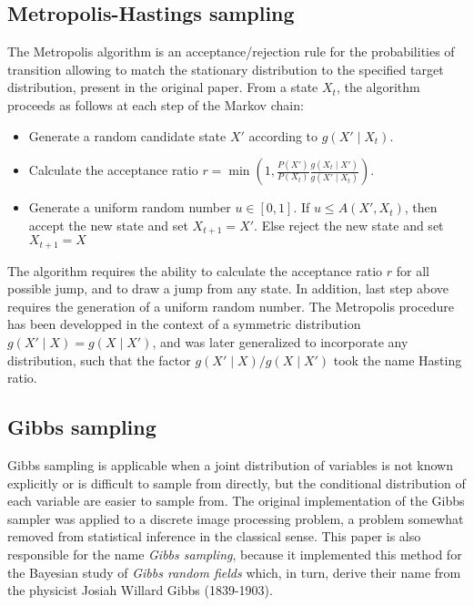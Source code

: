 \subsection{Metropolis-Hastings sampling}

The Metropolis algorithm is an acceptance/rejection rule for the probabilities of transition allowing to match the stationary distribution to the specified target distribution, present in the original paper.
From a state $X_t$, the algorithm proceeds as follows at each step of the Markov chain:
\begin{itemize}
	\item Generate a random candidate state $X'$ according to $g(X'\mid X_t)$.
	\item Calculate the acceptance ratio $\displaystyle r=\min \left(1,{\frac {P(X')}{P(X_{t})}}{\frac {g(X_{t}\mid X')}{g(X'\mid X_{t})}}\right)$.
	\item Generate a uniform random number $u\in [0,1]$.
	If $u\leq A(X',X_{t})$, then accept the new state and set $X_{t+1}=X'$.
	Else reject the new state and set $X_{t+1}=X$
\end{itemize}

The algorithm requires the ability to calculate the acceptance ratio $r$ for all possible jump, and to draw a jump from any state. 
In addition, last step above requires the generation of a uniform random number.
The Metropolis procedure has been developped in the context of a symmetric distribution $g(X'\mid X) = g(X \mid X')$, and was later generalized to incorporate any distribution, such that the factor $g(X'\mid X) / g(X \mid X')$ took the name Hasting ratio.

\subsection{Gibbs sampling}

Gibbs sampling is applicable when a joint distribution of variables is not known explicitly or is difficult to sample from directly, but the conditional distribution of each variable are easier to sample from.
The original implementation of the Gibbs sampler was applied to a discrete image processing problem, a problem somewhat removed from statistical inference in the classical sense.
This paper is also responsible for the name {\it Gibbs sampling}, because it implemented this method for the Bayesian study of {\it Gibbs random fields} which, in turn, derive their name from the physicist Josiah Willard Gibbs (1839-1903).

